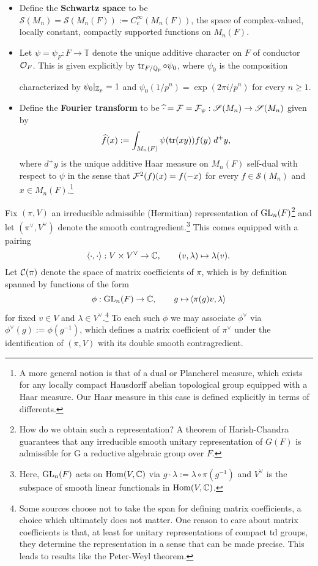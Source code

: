 \documentclass[11pt]{article}
\renewcommand{\S}{\mathscr{S}}
\newcommand{\T}{\mathbb{T}}
\begin{document}
\begin{definition}
\hfill
\begin{itemize}
\item Define the \textbf{Schwartz space} to be $\S(M_n)=\S(M_n(F)):=C_c^{\infty}(M_n(F))$, the space of complex-valued, locally constant, compactly supported functions on $M_n(F)$.

\item Let $\psi=\psi_F: F\to\T$ denote the unique additive character on $F$ of conductor $\mathcal{O}_F$. This is given explicitly by $\operatorname{tr}_{F/\mathbb{Q}_p}\circ\psi_0$, where $\psi_0$ is the composition
\begin{center}
\end{center}
characterized by $\psi_0|_{\mathbb{Z}_p}=1$ and $\psi_0(1/p^n)=\exp(2\pi i/p^n)$ for every $n\geq1$.

\item Define the \textbf{Fourier transform} to be $\w{\cdot}=\mc{F}=\mc{F}_{\psi}: \S(M_n)\to\S(M_n)$ given by
$$\widehat{f}(x):=\int_{M_n(F)}\psi(\operatorname{tr}(xy))f(y)\;d^+y,$$
where $d^+y$ is the unique additive Haar measure on $M_n(F)$ self-dual with respect to $\psi$ in the sense that $\mathcal{F}^2(f)(x)=f(-x)$ for every $f\in\S(M_n)$ and $x\in M_n(F)$.\footnote{A more general notion is that of a dual or Plancherel measure, which exists for any locally compact Hausdorff abelian topological group equipped with a Haar measure. Our Haar measure in this case is defined explicitly in terms of differents.}
\end{itemize}
\end{definition}

Fix $(\pi,V)$ an irreducible admissible (Hermitian) representation of $\textup{GL}_n(F)$\footnote{How do we obtain such a representation? A theorem of Harish-Chandra guarantees that any irreducible smooth unitary representation of $G(F)$ is admissible for G a reductive algebraic group over $F$.} and let $(\pi^{\vee},V^{\vee})$ denote the smooth contragredient.\footnote{Here, $\textup{GL}_n(F)$ acts on $\operatorname{Hom}(V,\mathbb{C})$ via $g\cdot\lambda:=\lambda\circ\pi(g^{-1})$ and $V^{\vee}$ is the subspace of smooth linear functionals in $\operatorname{Hom}(V,\mathbb{C})$.} This comes equipped with a pairing
$$\!\left\langle\cdot,\cdot\right\rangle: V\times V^{\vee}\to\mathbb{C},\qquad(v,\lambda)\mapsto\lambda(v).$$
Let $\mathcal{C}(\pi)$ denote the space of matrix coefficients of $\pi$, which is by definition spanned by functions of the form 
$$\phi: \textup{GL}_n(F)\to\mathbb{C},\qquad g\mapsto\!\left\langle\pi(g)v,\lambda\right\rangle$$
for fixed $v\in V$ and $\lambda\in V^{\vee}$.\footnote{Some sources choose not to take the span for defining matrix coefficients, a choice which ultimately does not matter. One reason to care about matrix coefficients is that, at least for unitary representations of compact td groups, they determine the representation in a sense that can be made precise. This leads to results like the Peter-Weyl theorem.} To each such $\phi$ we may associate $\phi^{\vee}$ via $\phi^{\vee}(g):=\phi(g^{-1})$, which defines a matrix coefficient of $\pi^{\vee}$ under the identification of $(\pi,V)$ with its double smooth contragredient.
\end{document}
